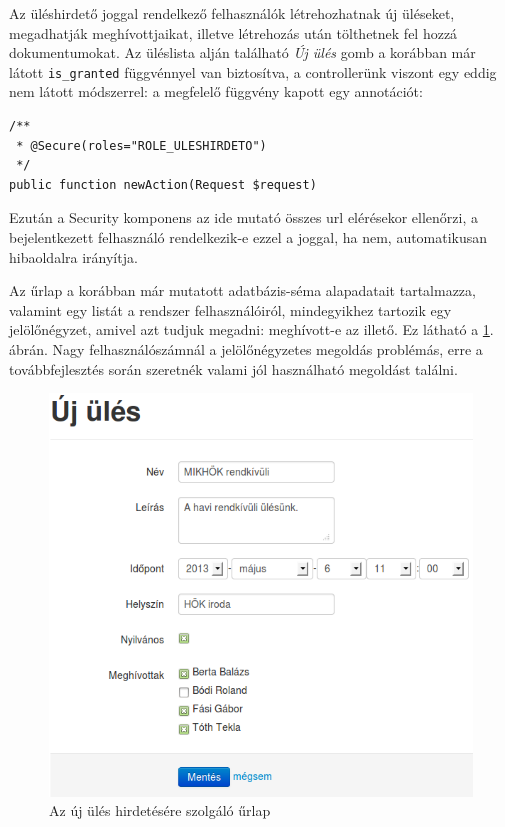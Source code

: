 \documentclass[a4paper,12pt,oneside]{report}
\begin{document}
Az üléshirdető joggal rendelkező felhasználók létrehozhatnak új üléseket, megadhatják meghívottjaikat, illetve létrehozás után tölthetnek fel hozzá dokumentumokat. Az üléslista alján található {\it Új ülés} gomb a korábban már látott {\tt is\_granted} függvénnyel van biztosítva, a controllerünk viszont egy eddig nem látott módszerrel: a megfelelő függvény kapott egy annotációt:

\begin{lstlisting}
/**
 * @Secure(roles="ROLE_ULESHIRDETO")
 */
public function newAction(Request $request)
\end{lstlisting}

Ezután a Security komponens az ide mutató összes url elérésekor ellenőrzi, a bejelentkezett felhasználó rendelkezik-e ezzel a joggal, ha nem, automatikusan hibaoldalra irányítja.

Az űrlap a korábban már mutatott adatbázis-séma alapadatait tartalmazza, valamint egy listát a rendszer felhasználóiról, mindegyikhez tartozik egy jelölőnégyzet, amivel azt tudjuk megadni: meghívott-e az illető. Ez látható a \ref{fig:ules_uj}. ábrán. Nagy felhasználószámnál a jelölőnégyzetes megoldás problémás, erre a továbbfejlesztés során szeretnék valami jól használható megoldást találni.

\begin{figure}[h]
    \centering
    \includegraphics[width=.9\textwidth]{ules_uj.png}
    \caption{Az új ülés hirdetésére szolgáló űrlap}
    \label{fig:ules_uj}
\end{figure}
\end{document}
